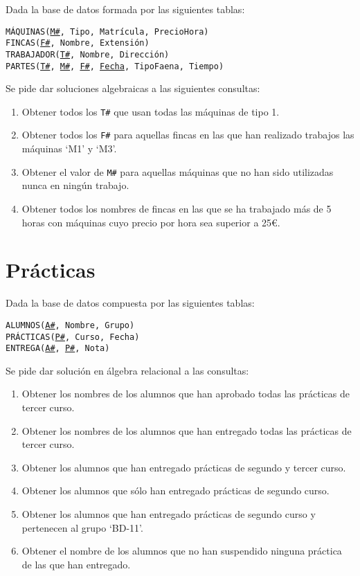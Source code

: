 \documentclass{db-practice}
\begin{document}
Dada la base de datos formada por las siguientes tablas:

\begin{addmargin}[1.5em]{0em}
    \texttt{MÁQUINAS(\underline{M\#}, Tipo, Matrícula, PrecioHora)}\\
    \texttt{FINCAS(\underline{F\#}, Nombre, Extensión)}\\
    \texttt{TRABAJADOR(\underline{T\#}, Nombre, Dirección)}\\
    \texttt{PARTES(\underline{T\#}, \underline{M\#}, \underline{F\#}, \underline{Fecha}, TipoFaena, Tiempo)}
\end{addmargin}

Se pide dar soluciones algebraicas a las siguientes consultas:

\begin{enumerate}
    \item Obtener todos los \texttt{T\#} que usan todas las máquinas de tipo 1.
    \item Obtener todos los \texttt{F\#} para aquellas fincas en las que han realizado trabajos las máquinas `M1' y `M3'.
    \item Obtener el valor de \texttt{M\#} para aquellas máquinas que no han sido utilizadas nunca en ningún trabajo.
    \item Obtener todos los nombres de fincas en las que se ha trabajado más de 5 horas con máquinas cuyo precio por hora sea superior a 25€.
\end{enumerate}

\section{Prácticas}

Dada la base de datos compuesta por las siguientes tablas:

\begin{addmargin}[1.5em]{0em}
    \texttt{ALUMNOS(\underline{A\#}, Nombre, Grupo)}\\
    \texttt{PRÁCTICAS(\underline{P\#}, Curso, Fecha)}\\
    \texttt{ENTREGA(\underline{A\#}, \underline{P\#}, Nota)}
\end{addmargin}

Se pide dar solución en álgebra relacional a las consultas:

\begin{enumerate}
    \item Obtener los nombres de los alumnos que han aprobado todas las prácticas de tercer curso.
    \item Obtener los nombres de los alumnos que han entregado todas las prácticas de tercer curso.
    \item Obtener los alumnos que han entregado prácticas de segundo y tercer curso.
    \item Obtener los alumnos que sólo han entregado prácticas de segundo curso.
    \item Obtener los alumnos que han entregado prácticas de segundo curso y pertenecen al grupo `BD-11'.
    \item Obtener el nombre de los alumnos que no han suspendido ninguna práctica de las que han entregado.
\end{enumerate}
\end{document}

